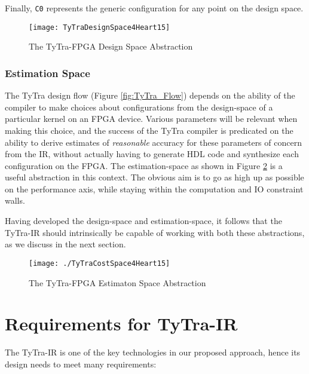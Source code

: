 \documentclass[]{heart2015_WN4Pre}
\begin{document}
Finally, \texttt{C0} represents the generic configuration for any point on the design space. 

\begin{figure}[thb]
\centering
\texttt{[image: TyTraDesignSpace4Heart15]}
\caption{The TyTra-FPGA Design Space Abstraction}
\label{fig:designSpace}
\end{figure}

\subsubsection*{Estimation Space}

The TyTra design flow (Figure \ref{fig:TyTra_Flow}) depends on the ability of the compiler to make choices about configurations from the design-space of a particular kernel on an FPGA device. Various parameters will be relevant when making this choice, and the success of the TyTra compiler is predicated on the ability to derive estimates of \textit{reasonable} accuracy for these parameters of concern from the IR, without actually having to generate HDL code and synthesize each configuration on the FPGA. The estimation-space as shown in Figure \ref{fig:TyTraCostSpace4Heart15} is a useful abstraction in this context. The obvious aim is to go as high up as possible on the performance axis, while staying within the computation and IO constraint walls. 

Having developed the design-space and estimation-space, it follows that the TyTra-IR should intrinsically be capable of working with both these abstractions, as we discuss in the next section.

\begin{figure}
\centering
\texttt{[image: ./TyTraCostSpace4Heart15]}
\caption{The TyTra-FPGA Estimaton Space Abstraction}
\label{fig:TyTraCostSpace4Heart15}
\end{figure}
 

\section{Requirements for TyTra-IR}
\label{sec:tir-requirements}



The TyTra-IR is one of the key  technologies in our proposed approach, hence its design needs to meet many requirements:
\end{document}
